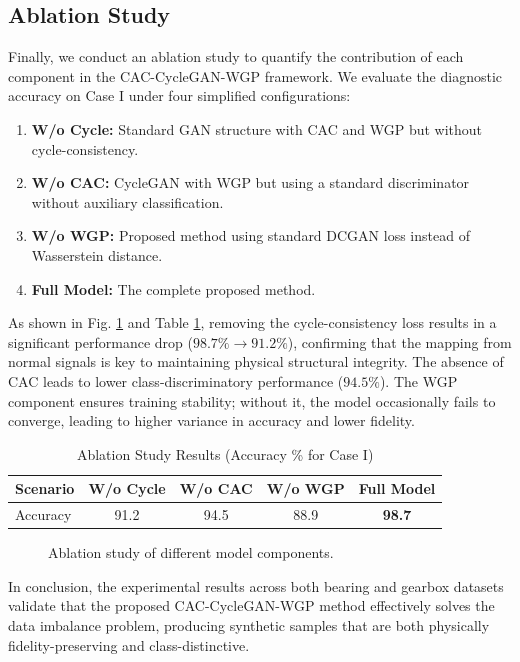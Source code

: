 \subsection{Ablation Study}
Finally, we conduct an ablation study to quantify the contribution of each component in the CAC-CycleGAN-WGP framework. We evaluate the diagnostic accuracy on Case I under four simplified configurations:
\begin{enumerate}
    \item \textbf{W/o Cycle:} Standard GAN structure with CAC and WGP but without cycle-consistency.
    \item \textbf{W/o CAC:} CycleGAN with WGP but using a standard discriminator without auxiliary classification.
    \item \textbf{W/o WGP:} Proposed method using standard DCGAN loss instead of Wasserstein distance.
    \item \textbf{Full Model:} The complete proposed method.
\end{enumerate}

As shown in Fig. \ref{fig:ablation_chart} and Table \ref{tab:ablation}, removing the cycle-consistency loss results in a significant performance drop ($98.7\% \to 91.2\%$), confirming that the mapping from normal signals is key to maintaining physical structural integrity. The absence of CAC leads to lower class-discriminatory performance ($94.5\%$). The WGP component ensures training stability; without it, the model occasionally fails to converge, leading to higher variance in accuracy and lower fidelity.

\begin{table}[htbp]
\centering
\caption{Ablation Study Results (Accuracy \% for Case I)}
\label{tab:ablation}
\begin{tabular}{lcccc}
\hline
\textbf{Scenario} & W/o Cycle & W/o CAC & W/o WGP & \textbf{Full Model} \\ \hline
Accuracy & 91.2 & 94.5 & 88.9 & \textbf{98.7} \\
\hline
\end{tabular}
\end{table}

\begin{figure}[htbp]
\centering
\caption{Ablation study of different model components.}
\label{fig:ablation_chart}
\end{figure}

In conclusion, the experimental results across both bearing and gearbox datasets validate that the proposed CAC-CycleGAN-WGP method effectively solves the data imbalance problem, producing synthetic samples that are both physically fidelity-preserving and class-distinctive.

